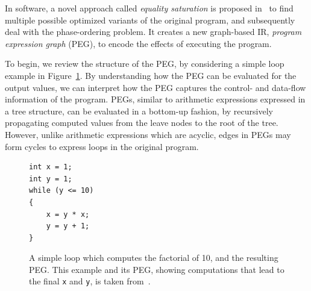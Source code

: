 In software, a novel approach called \emph{equality saturation} is proposed
in~\cite{tate09} to find multiple possible optimized variants of the original
program, and subsequently deal with the phase-ordering problem.  It creates
a new graph-based IR, \emph{program expression graph} (PEG), to encode the
effects of executing the program.

To begin, we review the structure of the PEG, by considering a simple loop
example in Figure~\ref{bg:fig:factorial}.  By understanding how the PEG can
be evaluated for the output values, we can interpret how the PEG captures the
control- and data-flow information of the program.  PEGs, similar to arithmetic
expressions expressed in a tree structure, can be evaluated in a bottom-up
fashion, by recursively propagating computed values from the leave nodes to the
root of the tree.  However, unlike arithmetic expressions which are acyclic,
edges in PEGs may form cycles to express loops in the original program.
\begin{figure}[ht]
    \newsavebox{\factlstbox}
    \begin{lrbox}{\factlstbox}
    \begin{lstlisting}
int x = 1;
int y = 1;
while (y <= 10)
{
    x = y * x;
    y = y + 1;
}
    \end{lstlisting}
    \end{lrbox}
    \centering
    \caption{%
        A simple loop which computes the factorial of 10, and the resulting
        PEG\@.  This example and its PEG, showing computations that lead to the
        final \texttt{x} and \texttt{y}, is taken from~\cite{tate09}.
    }\label{bg:fig:factorial}
\end{figure}

